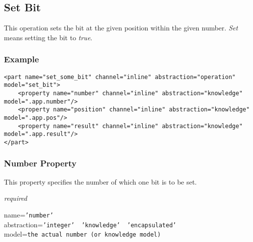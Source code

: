 %
%
%
%
%
%

\subsection{Set Bit}
\label{set_bit_heading}

This operation sets the bit at the given position within the given number.
\emph{Set} means setting the bit to \emph{true}.

\subsubsection{Example}

\begin{scriptsize}
    \begin{verbatim}
<part name="set_some_bit" channel="inline" abstraction="operation" model="set_bit">
    <property name="number" channel="inline" abstraction="knowledge" model=".app.number"/>
    <property name="position" channel="inline" abstraction="knowledge" model=".app.pos"/>
    <property name="result" channel="inline" abstraction="knowledge" model=".app.result"/>
</part>
    \end{verbatim}
\end{scriptsize}

\subsubsection{Number Property}

This property specifies the number of which one bit is to be set.

\emph{required}

name=\texttt{'number'}\\
abstraction=\texttt{'integer' \vline\ 'knowledge' \vline\ 'encapsulated'}\\
model=\texttt{the actual number (or knowledge model)}

